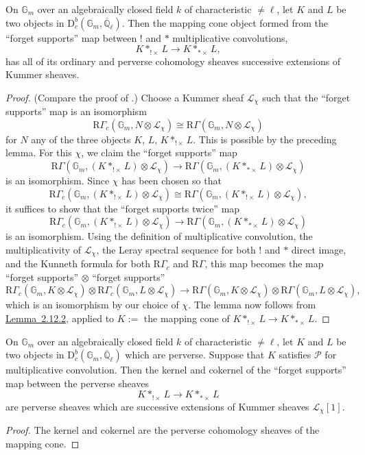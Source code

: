 On \(\mathbb{G}_m\) over an algebraically closed field \(k\) of characteristic
\(\ne\ell\), let \(K\) and \(L\) be two objects in
\(\mathrm{D}^b_c(\mathbb{G}_m,\overline{\mathbb{Q}}_\ell)\). Then the mapping
cone object formed from the ``forget supports'' map between \(!\) and \(*\)
multiplicative convolutions,
\[
  K*_{!\times}L\to K*_{*\times}L,
\]
has all of its ordinary and perverse cohomology sheaves successive extensions
of Kummer sheaves.
\begin{proof}
(Compare the proof of \cite[page~28]{Ga-Loe}.) Choose a Kummer sheaf
\(\mathcal{L}_\chi\) such that the ``forget supports'' map is an isomorphism
\[
  \mathrm{R}\Gamma_c(\mathbb{G}_m,N\otimes\mathcal{L}_\chi)
  \cong
  \mathrm{R}\Gamma(\mathbb{G}_m,N\otimes\mathcal{L}_\chi)
\]
for \(N\) any of the three objects \(K\), \(L\), \(K*_{!\times}L\). This is
possible by the preceding lemma. For this \(\chi\), we claim the ``forget
supports'' map
\[
  \mathrm{R}\Gamma(\mathbb{G}_m,(K*_{!\times}L)\otimes\mathcal{L}_\chi)
  \to
  \mathrm{R}\Gamma(\mathbb{G}_m,(K*_{*\times}L)\otimes\mathcal{L}_\chi)
\]
is an isomorphism. Since \(\chi\) has been chosen so that
\[
  \mathrm{R}\Gamma_c(\mathbb{G}_m,(K*_{!\times}L)\otimes\mathcal{L}_\chi)
  \cong
  \mathrm{R}\Gamma(\mathbb{G}_m,(K*_{!\times}L)\otimes\mathcal{L}_\chi),
\]
it suffices to show that the ``forget supports twice'' map
\[
  \mathrm{R}\Gamma_c(\mathbb{G}_m,(K*_{!\times}L)\otimes\mathcal{L}_\chi)
  \to
  \mathrm{R}\Gamma(\mathbb{G}_m,(K*_{*\times}L)\otimes\mathcal{L}_\chi)
\]
is an isomorphism. Using the definition of multiplicative convolution, the
multiplicativity of \(\mathcal{L}_\chi\), the Leray spectral sequence for both
\(!\) and \(*\) direct image, and the Kunneth formula for both
\(\mathrm{R}\Gamma_c\) and \(\mathrm{R}\Gamma\), this map becomes the map
``forget supports'' \(\otimes\) ``forget supports''
\[
  \mathrm{R}\Gamma_c(\mathbb{G}_m,K\otimes\mathcal{L}_\chi)\otimes
  \mathrm{R}\Gamma_c(\mathbb{G}_m,L\otimes\mathcal{L}_\chi)
  \to
  \mathrm{R}\Gamma(\mathbb{G}_m,K\otimes\mathcal{L}_\chi)\otimes
  \mathrm{R}\Gamma(\mathbb{G}_m,L\otimes\mathcal{L}_\chi),
\]
which is an isomorphism by our choice of \(\chi\). The lemma now follows from
\hyperref[lem:2.12.2]{Lemma~2.12.2}, applied to \(K:=\) the mapping cone of
\(K*_{!\times}L\to K*_{*\times}L\).
\end{proof}

On \(\mathbb{G}_m\) over an algebraically closed field \(k\) of characteristic
\(\ne\ell\), let \(K\) and \(L\) be two objects in
\(\mathrm{D}^b_c(\mathbb{G}_m,\overline{\mathbb{Q}}_\ell)\) which are
perverse. Suppose that \(K\) satisfies \(\mathcal{P}\) for multiplicative
convolution. Then the kernel and cokernel of the ``forget supports'' map
between the perverse sheaves
\[
  K*_{!\times}L\to K*_{*\times}L
\]
are perverse sheaves which are successive extensions of Kummer sheaves
\(\mathcal{L}_\chi[1]\).
\begin{proof}
The kernel and cokernel are the perverse cohomology sheaves of the mapping
cone.
\end{proof}

